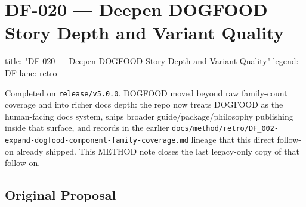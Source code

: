 \chapter{DF-020 --- Deepen DOGFOOD Story Depth and Variant Quality}\label{record-292}

\smallskip

\begin{RecordMeta}
title: "DF-020 — Deepen DOGFOOD Story Depth and Variant Quality"
legend: DF
lane: retro

\end{RecordMeta}

Completed on \texttt{r\allowbreak{}e\allowbreak{}l\allowbreak{}e\allowbreak{}a\allowbreak{}s\allowbreak{}e\allowbreak{}/\allowbreak{}v\allowbreak{}5\allowbreak{}.\allowbreak{}0\allowbreak{}.\allowbreak{}0}. DOGFOOD moved beyond raw family-count coverage and into richer docs depth: the repo now treats DOGFOOD as the human-facing docs system, ships broader guide/package/philosophy publishing inside that surface, and records in the earlier \texttt{d\allowbreak{}o\allowbreak{}c\allowbreak{}s\allowbreak{}/\allowbreak{}m\allowbreak{}e\allowbreak{}t\allowbreak{}h\allowbreak{}o\allowbreak{}d\allowbreak{}/\allowbreak{}r\allowbreak{}e\allowbreak{}t\allowbreak{}r\allowbreak{}o\allowbreak{}/\allowbreak{}D\allowbreak{}F\allowbreak{}\_\allowbreak{}0\allowbreak{}0\allowbreak{}2\allowbreak{}-\allowbreak{}e\allowbreak{}x\allowbreak{}p\allowbreak{}a\allowbreak{}n\allowbreak{}d\allowbreak{}-\allowbreak{}d\allowbreak{}o\allowbreak{}g\allowbreak{}f\allowbreak{}o\allowbreak{}o\allowbreak{}d\allowbreak{}-\allowbreak{}c\allowbreak{}o\allowbreak{}m\allowbreak{}p\allowbreak{}o\allowbreak{}n\allowbreak{}e\allowbreak{}n\allowbreak{}t\allowbreak{}-\allowbreak{}f\allowbreak{}a\allowbreak{}m\allowbreak{}i\allowbreak{}l\allowbreak{}y\allowbreak{}-\allowbreak{}c\allowbreak{}o\allowbreak{}v\allowbreak{}e\allowbreak{}r\allowbreak{}a\allowbreak{}g\allowbreak{}e\allowbreak{}.\allowbreak{}m\allowbreak{}d} lineage that this direct follow-on already shipped. This METHOD note closes the last legacy-only copy of that follow-on.

\section{Original Proposal}\label{record-292-original-proposal}

